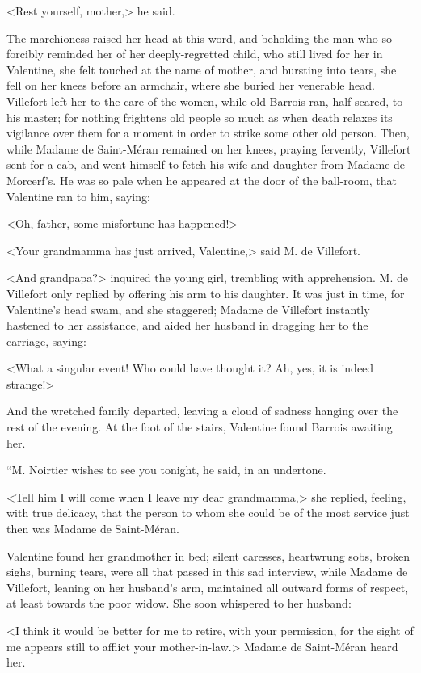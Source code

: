  <Rest yourself, mother,> he said. 

 The marchioness raised her head at this word, and beholding the man who so forcibly reminded her of her deeply-regretted child, who still lived for her in Valentine, she felt touched at the name of mother, and bursting into tears, she fell on her knees before an armchair, where she buried her venerable head. Villefort left her to the care of the women, while old Barrois ran, half-scared, to his master; for nothing frightens old people so much as when death relaxes its vigilance over them for a moment in order to strike some other old person. Then, while Madame de Saint-Méran remained on her knees, praying fervently, Villefort sent for a cab, and went himself to fetch his wife and daughter from Madame de Morcerf's. He was so pale when he appeared at the door of the ball-room, that Valentine ran to him, saying: 

 <Oh, father, some misfortune has happened!> 

 <Your grandmamma has just arrived, Valentine,> said M. de Villefort. 

 <And grandpapa?> inquired the young girl, trembling with apprehension. M. de Villefort only replied by offering his arm to his daughter. It was just in time, for Valentine's head swam, and she staggered; Madame de Villefort instantly hastened to her assistance, and aided her husband in dragging her to the carriage, saying: 

 <What a singular event! Who could have thought it? Ah, yes, it is indeed strange!> 

 And the wretched family departed, leaving a cloud of sadness hanging over the rest of the evening. At the foot of the stairs, Valentine found Barrois awaiting her. 

 “M. Noirtier wishes to see you tonight, he said, in an undertone. 

 <Tell him I will come when I leave my dear grandmamma,> she replied, feeling, with true delicacy, that the person to whom she could be of the most service just then was Madame de Saint-Méran. 

 Valentine found her grandmother in bed; silent caresses, heartwrung sobs, broken sighs, burning tears, were all that passed in this sad interview, while Madame de Villefort, leaning on her husband's arm, maintained all outward forms of respect, at least towards the poor widow. She soon whispered to her husband: 

 <I think it would be better for me to retire, with your permission, for the sight of me appears still to afflict your mother-in-law.> Madame de Saint-Méran heard her. 

